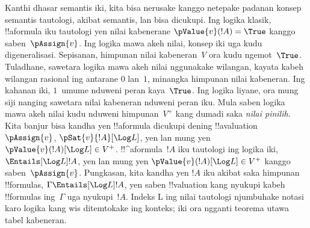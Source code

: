 \documentclass[../../../include/open-logic-section]{subfiles}
\begin{document}
Kanthi dhasar semantis iki, kita bisa nerusake kanggo netepake
padanan konsep semantis tautologi, akibat semantis, lan bisa dicukupi.
Ing logika klasik, !!a{formula} iku tautologi yen nilai kabenerane
$\pValue{v}(!A) = \True$ kanggo saben~$\pAssign{v}$. Ing logika
mawa akeh nilai, konsep iki uga kudu digeneralisasi. Sepisanan,
himpunan nilai kabeneran~$V$ ora kudu ngemot~$\True$. Tuladhane,
sawetara logika mawa akeh nilai nggunakake wilangan, kayata kabeh
wilangan rasional ing antarane $0$ lan~$1$, minangka himpunan nilai
kabeneran. Ing kahanan iki, $1$~umume nduweni peran kaya~$\True$.
Ing logika liyane, ora mung siji nanging sawetara nilai kabeneran
nduweni peran iku. Mula saben logika mawa akeh nilai kudu nduweni
himpunan~$V^+$ kang dumadi saka \emph{nilai pinilih}. Kita banjur
bisa kandha yen !!a{formula} dicukupi dening
!!a{valuation}~$\pAssign{v}$, $\pSat{v}{!A}[\Log L]$, yen lan mung yen
$\pValue{v}(!A)[\Log L] \in V^+$. !!^a{formula}~$!A$ iku tautologi
ing logika iki, $\Entails[\Log L] !A$, yen lan mung yen
$\pValue{v}(!A)[\Log L] \in V^+$ kanggo saben~$\pAssign{v}$.
Pungkasan, kita kandha yen $!A$ iku akibat saka himpunan
!!{formula}s, $\Gamma \Entails[\Log L] !A$, yen saben !!{valuation}
kang nyukupi kabeh !!{formula}s ing~$\Gamma$ uga nyukupi~$!A$. Indeks L ing nilai tautologi njumbuhake notasi karo logika kang wis ditemtokake ing konteks; iki ora ngganti teorema utawa tabel kabeneran.
\end{document}
